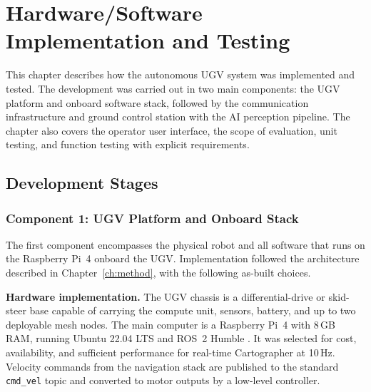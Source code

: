 
\chapter{Hardware/Software Implementation and Testing}
\label{ch:impl}

This chapter describes how the autonomous UGV system was implemented and tested. The development was carried out in two main components: the UGV platform and onboard software stack, followed by the communication infrastructure and ground control station with the AI perception pipeline. The chapter also covers the operator user interface, the scope of evaluation, unit testing, and function testing with explicit requirements.

\section{Development Stages}

\subsection{Component 1: UGV Platform and Onboard Stack}

The first component encompasses the physical robot and all software that runs on the Raspberry Pi~4 onboard the UGV. Implementation followed the architecture described in Chapter~\ref{ch:method}, with the following as-built choices.

\textbf{Hardware implementation.} The UGV chassis is a differential-drive or skid-steer base capable of carrying the compute unit, sensors, battery, and up to two deployable mesh nodes. The main computer is a Raspberry Pi~4 with 8\,GB RAM, running Ubuntu 22.04 LTS \cite{ubuntuhelp} and ROS~2 Humble \cite{ros2humble}. It was selected for cost, availability, and sufficient performance for real-time Cartographer \cite{hess2016} at 10\,Hz. Velocity commands from the navigation stack are published to the standard \texttt{cmd\_vel} topic and converted to motor outputs by a low-level controller.

